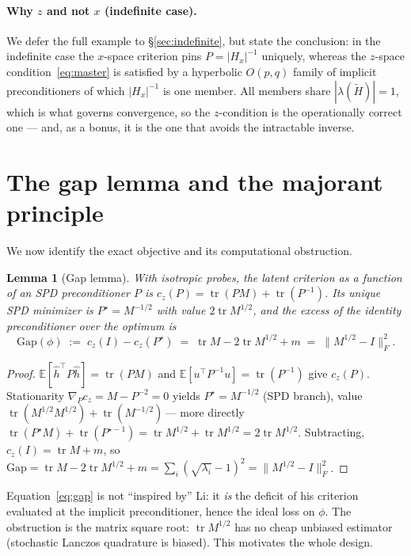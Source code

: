 \documentclass[11pt]{article}
\theoremstyle{plain}
\newtheorem{lemma}{Lemma}
\theoremstyle{definition}
\theoremstyle{remark}
\DeclareMathOperator{\tr}{tr}
\newcommand{\E}{\mathbb{E}}
\newcommand{\Fnorm}[1]{\lVert #1 \rVert_F}
\newcommand{\tHess}{\tilde{H}}
\newcommand{\hh}{\hat{h}}
\begin{document}
\paragraph{Why $z$ and not $x$ (indefinite case).}
\label{para:zx}
We defer the full example to \S\ref{sec:indefinite}, but state the conclusion: in the
indefinite case the $x$-space criterion pins $P=|H_x|^{-1}$ uniquely, whereas the $z$-space
condition~\eqref{eq:master} is satisfied by a hyperbolic $O(p,q)$ family of implicit
preconditioners of which $|H_x|^{-1}$ is one member. All members share $|\lambda(\tHess)|=1$,
which is what governs convergence, so the $z$-condition is the operationally correct one ---
and, as a bonus, it is the one that avoids the intractable inverse.

\section{The gap lemma and the majorant principle}
\label{sec:gap}

We now identify the exact objective and its computational obstruction.

\begin{lemma}[Gap lemma]
\label{lem:gap}
With isotropic probes, the latent criterion as a function of an SPD preconditioner $P$ is
$c_z(P)=\tr(PM)+\tr(P^{-1})$. Its unique SPD minimizer is $P^\star=M^{-1/2}$ with value
$2\tr M^{1/2}$, and the excess of the identity preconditioner over the optimum is
\begin{equation}
\label{eq:gap}
  \mathrm{Gap}(\phi)\;:=\;c_z(I)-c_z(P^\star)
  \;=\;\tr M - 2\tr M^{1/2} + m
  \;=\;\Fnorm{M^{1/2}-I}^2 .
\end{equation}
\end{lemma}

\begin{proof}
$\E[\hh^{\!\top}P\hh]=\tr(PM)$ and $\E[u^{\!\top}P^{-1}u]=\tr(P^{-1})$ give $c_z(P)$.
Stationarity $\nabla_P c_z = M - P^{-2}=0$ yields $P^\star=M^{-1/2}$ (SPD branch), value
$\tr(M^{1/2}M^{1/2})+\tr(M^{-1/2})$\,--- more directly $\tr(P^\star M)+\tr(P^{\star-1})
=\tr M^{1/2}+\tr M^{1/2}=2\tr M^{1/2}$. Subtracting, $c_z(I)=\tr M+m$, so
$\mathrm{Gap}=\tr M-2\tr M^{1/2}+m=\sum_i(\sqrt{\lambda_i}-1)^2=\Fnorm{M^{1/2}-I}^2$.
\end{proof}

Equation~\eqref{eq:gap} is not ``inspired by'' Li: it \emph{is} the deficit of his
criterion evaluated at the implicit preconditioner, hence the ideal loss on $\phi$. The
obstruction is the matrix square root: $\tr M^{1/2}$ has no cheap unbiased estimator
(stochastic Lanczos quadrature is biased). This motivates the whole design.
\end{document}
